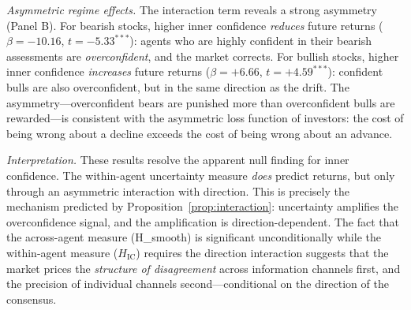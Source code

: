 \documentclass[12pt,a4paper]{article}
\begin{document}
\textit{Asymmetric regime effects.} The interaction term reveals a strong asymmetry (Panel B). For bearish stocks, higher inner confidence \textit{reduces} future returns ($\beta = -10.16$, $t = -5.33^{***}$): agents who are highly confident in their bearish assessments are \textit{overconfident}, and the market corrects. For bullish stocks, higher inner confidence \textit{increases} future returns ($\beta = +6.66$, $t = +4.59^{***}$): confident bulls are also overconfident, but in the same direction as the drift. The asymmetry---overconfident bears are punished more than overconfident bulls are rewarded---is consistent with the asymmetric loss function of investors: the cost of being wrong about a decline exceeds the cost of being wrong about an advance.

\textit{Interpretation.} These results resolve the apparent null finding for inner confidence. The within-agent uncertainty measure \textit{does} predict returns, but only through an asymmetric interaction with direction. This is precisely the mechanism predicted by Proposition~\ref{prop:interaction}: uncertainty amplifies the overconfidence signal, and the amplification is direction-dependent. The fact that the across-agent measure (H\_smooth) is significant unconditionally while the within-agent measure ($H_{\text{IC}}$) requires the direction interaction suggests that the market prices the \textit{structure of disagreement} across information channels first, and the precision of individual channels second---conditional on the direction of the consensus.
\end{document}
